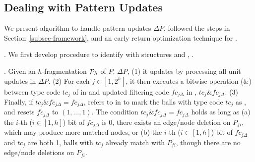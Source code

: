 \subsection{Dealing with Pattern Updates}
\label{subsec-Qinc}

We present algorithm \incp to handle pattern updates $\Delta P$, followed the steps in Section~\ref{subsec-framework}, and
an early return optimization technique for \incp.











.
We first develop procedure \identifyaffball to identify \affballsx with structures \fb and \bfc, .

.
Given an $h$-fragmentation ${\cal P}_{h}$ of $P$, $\Delta P$,
(1) it updates \bfc by processing all unit updates in $\Delta P$.
(2) For each $j\in [1, 2^h]$, it then executes a bitwise  operation (\&) between type code $tc_j$ of \fs in \fb and updated filtering code $fc_{j\Delta}$ in \bfc, \ie $tc_j\& fc_{j\Delta}$.
(3) Finally, if $tc_j\& fc_{j\Delta} = fc_{j\Delta}$, \identifyaffball refers to \bs in \fb to mark the balls with type code $tc_j$ as \affballsx, and resets $fc_{j\Delta}$ to $(1, \ldots, 1)$.
The condition $tc_j\& fc_{j\Delta} = fc_{j\Delta}$ holds as long as
(a) the $i$-th ($i\in [1, h]$) bit of $fc_{j\Delta}$ is 0, \ie there exists an edge/node deletion on ${P}_{fi}$, which may produce more matched nodes, or
(b) the $i$-th ($i\in [1, h]$) bit of $fc_{j\Delta}$ and $tc_j$ are both 1, \ie  balls with $tc_j$ already match with ${P}_{fi}$, though there are no edge/node deletions on ${P}_{fi}$.




